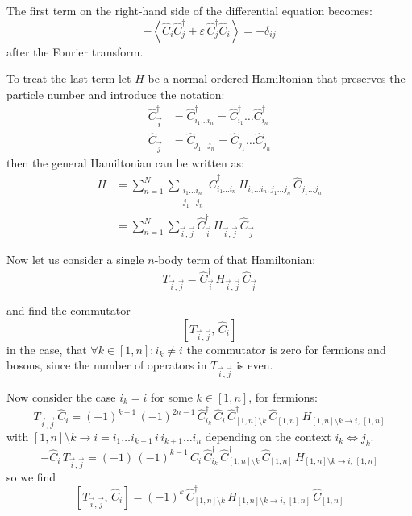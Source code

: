 The first term on the right-hand side of the differential equation becomes:
\begin{equation*}
    -\left\langle \hat{C}_i \hat{C}_j^{\dagger} + \varepsilon\, \hat{C}_j^{\dagger} \hat{C}_i \right\rangle = -\delta_{ij}
\end{equation*}
after the Fourier transform.

To treat the last term let $\hat{H}$ be a normal ordered Hamiltonian that preserves the particle number and introduce the notation:
\begin{align*}
    \hat{C}_{\vec{i}}^{\dagger} &= \hat{C}_{i_1 \dots i_n}^{\dagger} = \hat{C}_{i_1}^{\dagger} \dots \hat{C}_{i_n}^{\dagger} \\
    \hat{C}_{\vec{j}} &= \hat{C}_{j_1 \dots j_n} = \hat{C}_{j_1} \dots \hat{C}_{j_n}
\end{align*}
then the general Hamiltonian can be written as:
\begin{align*}
    \hat{H} &= \sum_{n=1}^{N} \sum_{\substack{i_1 \dots i_n \\ j_1 \dots j_n}} \hat{C}_{i_1 \dots i_n}^{\dagger}\, H_{i_1 \dots i_n, j_1 \dots j_n}\, \hat{C}_{j_1 \dots j_n} \\
    &= \sum_{n=1}^{N} \sum_{\vec{i}, \vec{j}} \hat{C}_{\vec{i}}^{\dagger}\, H_{\vec{i}, \vec{j}}\, \hat{C}_{\vec{j}}
\end{align*}

Now let us consider a single $n$-body term of that Hamiltonian:
\begin{equation*}
    T_{\vec{i}, \vec{j}} = \hat{C}_{\vec{i}}^{\dagger}\, H_{\vec{i}, \vec{j}}\, \hat{C}_{\vec{j}}
\end{equation*}

and find the commutator
\begin{equation*}
    \left[ T_{\vec{i},\vec{j}},\, \hat{C}_i \right]
\end{equation*}
in the case, that $\forall k \in [1,n]: i_k \neq i$ the commutator is zero for fermions and bosons, since the number of operators in $T_{\vec{i},\vec{j}}$ is even.

Now consider the case $i_k = i$ for some $k \in [1,n]$, for fermions:
\begin{equation*}
    T_{\vec{i},\vec{j}}\, \hat{C}_i = (-1)^{k-1}\, (-1)^{2n-1}\, \hat{C}_{i_k}^{\dagger}\, \hat{C}_i\, \hat{C}_{[1,n]\setminus k}^{\dagger}\, \hat{C}_{[1,n]}\, H_{[1,n]\setminus k \to i,\, [1,n]}
\end{equation*}
with $[1,n]\setminus k \to i = i_1 \dots i_{k-1}\, i\, i_{k+1} \dots i_n$ depending on the context $i_k \Leftrightarrow j_k$.
\begin{equation*}
    -\hat{C}_i\, T_{\vec{i},\vec{j}} = (-1)\, (-1)^{k-1}\, \hat{C}_i\, \hat{C}_{i_k}^{\dagger}\, \hat{C}_{[1,n]\setminus k}^{\dagger}\, \hat{C}_{[1,n]}\, H_{[1,n]\setminus k \to i,\, [1,n]}
\end{equation*}
so we find
\begin{equation*}
    \left[ T_{\vec{i},\vec{j}},\, \hat{C}_i \right] = (-1)^{k}\, \hat{C}_{[1,n]\setminus k}^{\dagger}\, H_{[1,n]\setminus k \to i,\, [1,n]}\, \hat{C}_{[1,n]}
\end{equation*}

